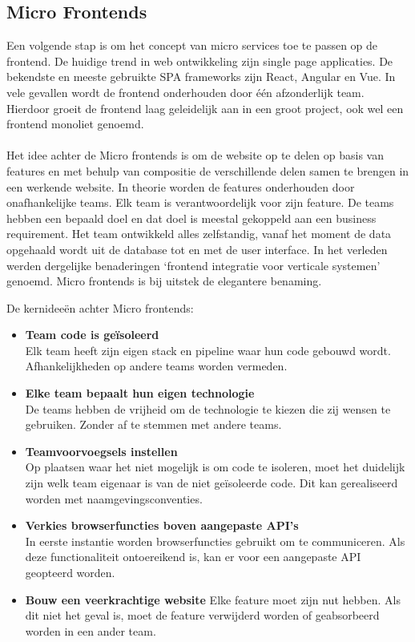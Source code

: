 \subsection{Micro Frontends}
Een volgende stap is om het concept van micro services toe te passen op de frontend. De huidige trend in web ontwikkeling zijn single page applicaties. De bekendste en meeste gebruikte SPA frameworks zijn React, Angular en Vue. In vele gevallen wordt de frontend onderhouden door één afzonderlijk team. Hierdoor groeit de frontend laag geleidelijk aan in een groot project, ook wel een frontend monoliet genoemd.\\\\
Het idee achter de Micro frontends is om de website op te delen op basis van features en met behulp van compositie de verschillende delen samen te brengen in een werkende website. In theorie worden de features onderhouden door onafhankelijke teams. Elk team is verantwoordelijk voor zijn feature. De teams hebben een bepaald doel en dat doel is meestal gekoppeld aan een business requirement. Het team ontwikkeld  alles zelfstandig, vanaf het moment de data opgehaald wordt uit de database  tot en met de user interface. In het verleden werden dergelijke benaderingen ‘frontend integratie voor verticale systemen’ genoemd. Micro frontends is bij uitstek de elegantere benaming.

De kernideeën achter Micro frontends:
\begin{itemize}
    \item \textbf{Team code is geïsoleerd} \\
          Elk team heeft zijn eigen stack en pipeline waar hun code gebouwd wordt. Afhankelijkheden op andere teams worden vermeden.
    \item \textbf{Elke team bepaalt hun eigen technologie} \\
          De teams hebben de vrijheid om de technologie te kiezen die zij wensen te gebruiken. Zonder af te stemmen met andere teams. 
    \item \textbf{Teamvoorvoegsels instellen}\\
          Op plaatsen waar het niet mogelijk is om code te isoleren, moet het duidelijk zijn welk team eigenaar is van de niet geïsoleerde code. Dit kan gerealiseerd worden met naamgevingsconventies.  
    \item \textbf{Verkies browserfuncties boven aangepaste API’s}\\
          In eerste instantie worden browserfuncties gebruikt om te communiceren. Als deze functionaliteit ontoereikend is, kan er voor een aangepaste API geopteerd worden. 
    \item \textbf{Bouw een veerkrachtige website}
          Elke feature moet zijn nut hebben. Als dit niet het geval is, moet de feature verwijderd worden of geabsorbeerd worden in een ander team.\\
\end{itemize}
